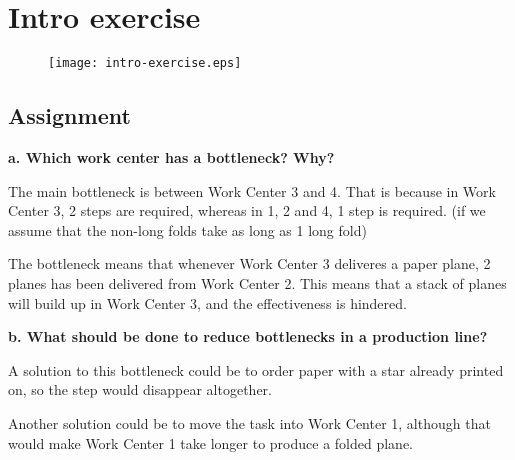 \section{Intro exercise}
\begin{figure}[!ht]
\texttt{[image: intro-exercise.eps]}
\end{figure}

\subsection{Assignment}

\begin{flushleft}
\textbf{a. Which work center has a bottleneck? Why?}

The main bottleneck is between Work Center 3 and 4.
That is because in Work Center 3, 2 steps are required, whereas in 1, 2 and 4, 1 step is required. (if we assume that the non-long folds take as long as 1 long fold)

The bottleneck means that whenever Work Center 3 deliveres a paper plane, 2 planes has been delivered from Work Center 2.
This means that a stack of planes will build up in Work Center 3, and the effectiveness is hindered.
\end{flushleft}

\begin{flushleft}
\textbf{b. What should be done to reduce bottlenecks in a production line?}

A solution to this bottleneck could be to order paper with a star already printed on, so the step would disappear altogether.

Another solution could be to move the task into Work Center 1, although that would make Work Center 1 take longer to produce a folded plane.
\end{flushleft}
